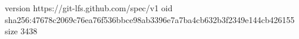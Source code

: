 version https://git-lfs.github.com/spec/v1
oid sha256:47678c2069c76ea76f536bbce98ab3396e7a7ba4cb632b3f2349e144cb426155
size 3438
